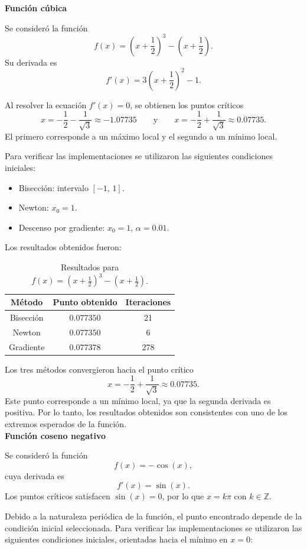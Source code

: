 \documentclass[12pt]{article}
\begin{document}
\textbf{Función cúbica}

Se consideró la función
\[
f(x) = \left(x + \frac{1}{2}\right)^3 - \left(x + \frac{1}{2}\right).
\]
Su derivada es
\[
f'(x) = 3\left(x + \frac{1}{2}\right)^2 - 1.
\]

Al resolver la ecuación $f'(x) = 0$, se obtienen los puntos críticos
\[
x = -\frac{1}{2} - \frac{1}{\sqrt{3}} \approx -1.07735
\qquad \text{y} \qquad
x = -\frac{1}{2} + \frac{1}{\sqrt{3}} \approx 0.07735.
\]
El primero corresponde a un máximo local y el segundo a un mínimo local.

Para verificar las implementaciones se utilizaron las siguientes condiciones iniciales:

\begin{itemize}
\item Bisección: intervalo $[-1,\, 1]$.
\item Newton: $x_0 = 1$.
\item Descenso por gradiente: $x_0 = 1$, $\alpha = 0.01$.
\end{itemize}

Los resultados obtenidos fueron:

\begin{table}[h]
\centering
\begin{tabular}{ccc}
\hline
Método & Punto obtenido & Iteraciones \\
\hline
Bisección & $0.077350$ & 21  \\
Newton    & $0.077350$ & 6   \\
Gradiente & $0.077378$ & 278 \\
\hline
\end{tabular}
\caption{Resultados para $f(x)=(x+\tfrac{1}{2})^3-(x+\tfrac{1}{2})$.}
\end{table}

Los tres métodos convergieron hacia el punto crítico
\[
x = -\frac{1}{2} + \frac{1}{\sqrt{3}} \approx 0.07735.
\]
Este punto corresponde a un mínimo local, ya que la segunda derivada es positiva. Por lo tanto, los resultados obtenidos son consistentes con uno de los extremos esperados de la función.\\

\textbf{Función coseno negativo}

Se consideró la función
\[
f(x) = -\cos(x),
\]
cuya derivada es
\[
f'(x) = \sin(x).
\]
Los puntos críticos satisfacen $\sin(x) = 0$, por lo que $x = k\pi$ con $k \in \mathbb{Z}$.

Debido a la naturaleza periódica de la función, el punto encontrado depende de la condición inicial seleccionada. Para verificar las implementaciones se utilizaron las siguientes condiciones iniciales, orientadas hacia el mínimo en $x = 0$:
\end{document}
